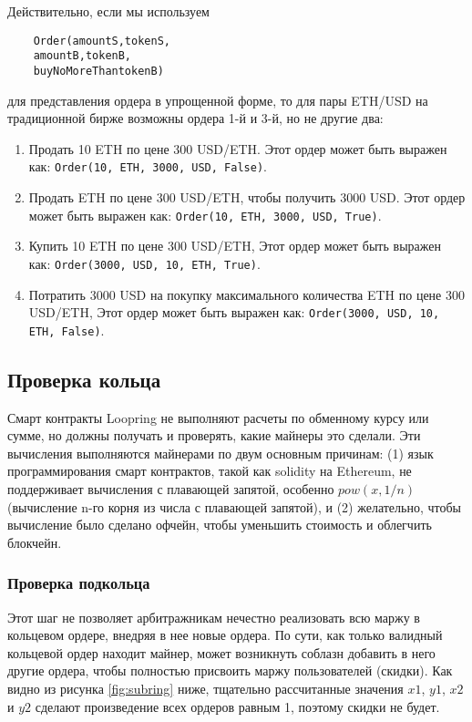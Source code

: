 \documentclass[utf8,nofonts]{article}
\begin{document}
\begin{multicols}{2}
	Действительно, если мы используем
	
	
	\begin{verbatim}
	Order(amountS,tokenS,
	amountB,tokenB,
	buyNoMoreThantokenB)
	\end{verbatim}
	
	для представления ордера в упрощенной форме, то для пары ETH/USD на традиционной бирже возможны ордера 1-й и 3-й, но не другие два:
	
	\begin{enumerate}
		\item Продать 10 ETH по цене 300 USD/ETH. Этот ордер может быть выражен как: \verb|Order(10, ETH, 3000, USD, False)|.
		\item Продать ETH по цене 300 USD/ETH, чтобы получить 3000 USD. Этот ордер может быть выражен как: \verb|Order(10, ETH, 3000, USD, True)|.
		\item Купить 10 ETH по цене 300 USD/ETH, Этот ордер может быть выражен как: \verb|Order(3000, USD, 10, ETH, True)|.
		\item Потратить 3000 USD на покупку максимального количества ETH по цене 300 USD/ETH, Этот ордер может быть выражен как: \verb|Order(3000, USD, 10, ETH, False)|.
	\end{enumerate}
	
	
	
	\subsection{Проверка кольца\label{sec:ring_verification}}
	
	Смарт контракты Loopring не выполняют расчеты по обменному курсу или сумме, но должны получать и проверять, какие майнеры это сделали. Эти вычисления выполняются майнерами по двум основным причинам: (1) язык программирования смарт контрактов, такой как solidity \cite{dannen2017introducing} на Ethereum, не поддерживает вычисления с плавающей запятой, особенно $ pow(x, 1/n) $ (вычисление n-го корня из числа с плавающей запятой), и (2) желательно, чтобы вычисление было сделано офчейн, чтобы уменьшить стоимость и облегчить блокчейн.
	
	
	\subsubsection{Проверка подкольца\label{sec:sub_ring_check}}
	Этот шаг не позволяет арбитражникам нечестно реализовать всю маржу в кольцевом ордере, внедряя в нее новые ордера. По сути, как только валидный кольцевой ордер находит майнер, может возникнуть соблазн добавить в него другие ордера, чтобы полностью присвоить маржу пользователей (скидки). Как видно из рисунка \ref{fig:subring} ниже, тщательно рассчитанные значения $ x1 $, $ y1 $, $ x2 $ и $ y2 $ сделают произведение всех ордеров равным 1, поэтому скидки не будет. 
	

\end{multicols}
\end{document}
